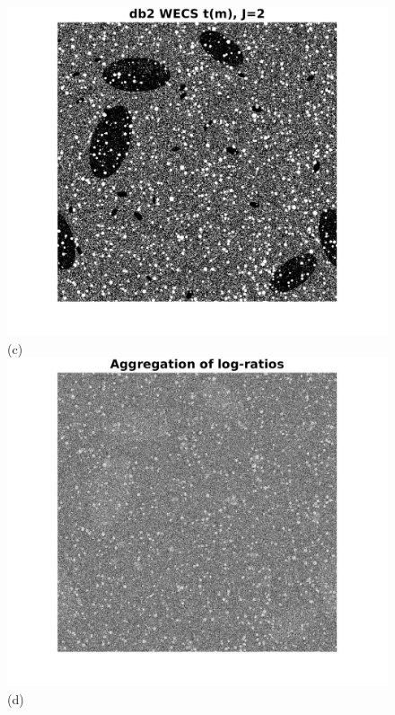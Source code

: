 \documentclass[journal]{IEEEtran}
\begin{document}
\begin{figure}[htp!]
\includegraphics[scale=.1]{../../figs/corr_changes_tm}(c)
\includegraphics[scale=.1]{../../figs/corr_changes_logratios}(d)

\end{figure}
\end{document}
